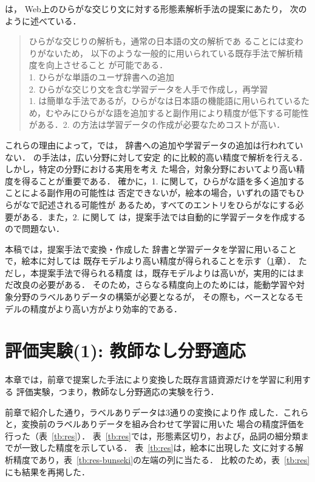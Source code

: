 \documentclass[japanese]{jnlp_1.4}
\newcommand{\refs}[1]{}
\newcommand{\pos}[1]{}
\begin{document}
は，
Web上のひらがな交じり文に対する形態素解析手法の提案にあたり，
次のように述べている．
\begin{quote}
ひらがな交じりの解析も，通常の日本語の文の解析であ
ることには変わりがないため，
以下のような一般的に用いられている既存手法で解析精度を向上させること
が可能である．\\
1. ひらがな単語のユーザ辞書への追加\\
2. ひらがな交じり文を含む学習データを人手で作成し，再学習\\
1. は簡単な手法であるが，ひらがなは日本語の機能語に用いられているた
め，むやみにひらがな語を追加すると副作用により精度が低下する可能性
がある．2. の方法は学習データの作成が必要なためコストが高い．
\end{quote}

これらの理由によって，では，
辞書への追加や学習データの追加は行われていない．
の手法は，広い分野に対して安定
的に比較的高い精度で解析を行える．しかし，特定の分野における実用を考え
た場合，対象分野においてより高い精度を得ることが重要である．
確かに，1. に関して，ひらがな語を多く追加することによる副作用の可能性は
否定できないが，絵本の場合，いずれの語でもひらがなで記述される可能性が
あるため，すべてのエントリをひらがなにする必要がある．また，2. に関して
は，提案手法では自動的に学習データを作成するので問題ない．

本稿では，提案手法で変換・作成した
辞書と学習データを学習に用いることで，絵本に対しては
既存モデルより高い精度が得られることを示す（\ref{sec:exp-adult}章）．
ただし，本提案手法で得られる精度
は，既存モデルよりは高いが，実用的にはまだ改良の必要がある．
そのため，さらなる精度向上のためには，能動学習や対象分野のラベルありデータの構築が必要となるが，
その際も，ベースとなるモデルの精度がより高い方がより効率的である．


\section{評価実験(1): 教師なし分野適応}
\label{sec:exp-adult}

本章では，前章で提案した手法により変換した既存言語資源だけを学習に利用する
評価実験，つまり，教師なし分野適応の実験を行う．

前章で紹介した通り，ラベルありデータは3通りの変換により作
  成した．これらと，変換前のラベルありデータを組み合わせて学習に用いた
  場合の精度評価を行った（表~\ref{tb:res}）．
表~\ref{tb:res}では，形態素区切り，および，品詞の細分類までが一致した精度を示している．
表~\ref{tb:res}は，絵本に出現した
文に対する解析精度であり，表~\ref{tb:res-bunseki}の左端\pos{元データ \refs{eva-org}}の列に当たる．
比較のため，表~\ref{tb:res}にも結果を再掲した．
\end{document}
